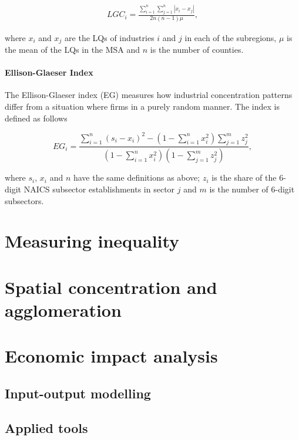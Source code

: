 \begin{eqnarray}
LGC_{i} =
\frac{\sum_{i=1}^{n}\sum_{j=1}^{n}|x_{i}-x_{j}|}{2n(n-1)\mu},
\end{eqnarray}

\noindent where $x_{i}$ and $x_{j}$ are the LQs of industries $i$ and $j$ in each of the subregions, $\mu$ is the mean of the LQs in the MSA and $n$ is the number of counties.

\paragraph{Ellison-Glaeser Index}
The Ellison-Glaeser index (EG) measures how industrial concentration patterns differ from a situation where firms in a purely random manner. The index is defined as follows

\begin{equation}
EG_{i} = \frac{\sum_{i=1}^{n}(s_{i}-x_{i})^2 - (1-
\sum^{n}_{i=1}x^{2}_{i})\sum^{m}_{j=1}z^{2}_{j}}{(1-
\sum^{n}_{i=1}x^{2}_{i})(1- \sum^{m}_{j=1}z^{2}_{j})},
\end{equation}

\noindent where $s_{i}$, $x_{i}$ and $n$ have the same definitions as above; $z_{i}$ is the share of the 6-digit NAICS subsector
establishments in sector $j$ and $m$ is the number of 6-digit subsectors.


\section{Measuring inequality}

\section{Spatial concentration and agglomeration}

\section{Economic impact analysis}
\subsection{Input-output modelling}
\subsection{Applied tools}
